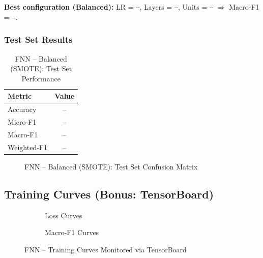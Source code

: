\documentclass[12pt,a4paper]{article}
\begin{document}
\noindent\textbf{Best configuration (Balanced):} LR = \texttt{--}, Layers = \texttt{--}, Units = \texttt{--} $\Rightarrow$ Macro-F1 = \texttt{--}.

\subsubsection{Test Set Results}

\begin{table}[H]
    \centering
    \caption{FNN -- Balanced (SMOTE): Test Set Performance}
    \label{tab:fnn_balanced_test}
    \begin{tabular}{lc}
        \toprule
        \textbf{Metric} & \textbf{Value} \\
        \midrule
        Accuracy    & -- \\
        Micro-F1    & -- \\
        Macro-F1    & -- \\
        Weighted-F1 & -- \\
        \bottomrule
    \end{tabular}
\end{table}

\begin{figure}[H]
    \centering
    \caption{FNN -- Balanced (SMOTE): Test Set Confusion Matrix}
    \label{fig:fnn_balanced_cm}
\end{figure}

\subsection{Training Curves (Bonus: TensorBoard)}

\begin{figure}[H]
    \centering
    \begin{subfigure}[b]{0.48\textwidth}
        \caption{Loss Curves}
        \label{fig:fnn_loss}
    \end{subfigure}
    \hfill
    \begin{subfigure}[b]{0.48\textwidth}
        \caption{Macro-F1 Curves}
        \label{fig:fnn_f1}
    \end{subfigure}
    \caption{FNN -- Training Curves Monitored via TensorBoard}
    \label{fig:fnn_training}
\end{figure}
\end{document}
